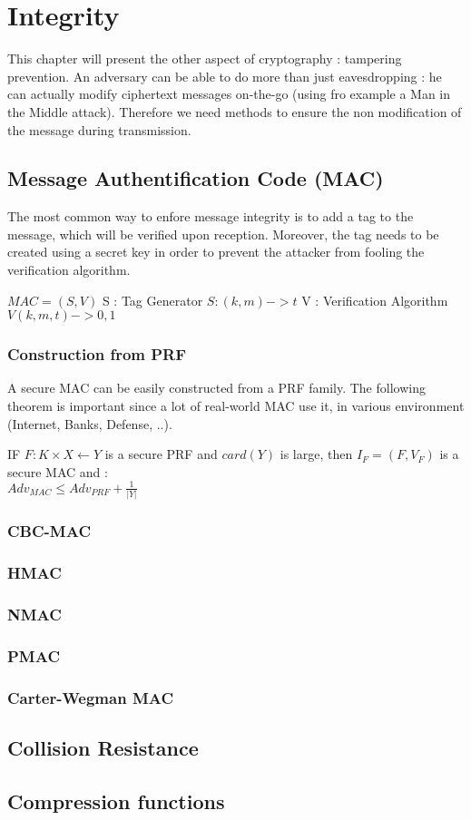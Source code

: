 \chapter{Integrity}


This chapter will present the other aspect of cryptography : tampering prevention. An adversary can be able to do more than just eavesdropping : he can actually modify ciphertext messages on-the-go (using fro example a Man in the Middle attack). Therefore we need methods to ensure the non modification of the message during transmission.

\section{Message Authentification Code (MAC)}

The most common way to enfore message integrity is to add a tag to the message, which will be verified upon reception. Moreover, the tag needs to be created using a secret key in order to prevent the attacker from fooling the verification algorithm.

$MAC = (S,V)$
S : Tag Generator
    $S: (k,m) -> t$
V : Verification Algorithm
    $V(k,m,t) -> {0,1}$
    
\subsection{Construction from PRF}

A secure MAC can be easily constructed from a PRF family. The following theorem is important since a lot of real-world MAC use it, in various environment (Internet, Banks, Defense, ..).

\begin{mytheorem}
    IF $F:K\times X \leftarrow Y$ is a secure PRF and $card(Y)$ is large, then $I_F = (F, V_F)$ is a secure MAC and : \\
    $ Adv_{MAC} \leq Adv_{PRF} + \frac{1}{|Y|} $
\end{mytheorem}


\subsection{CBC-MAC}
\subsection{HMAC}
\subsection{NMAC}
\subsection{PMAC}
\subsection{Carter-Wegman MAC}


\section{Collision Resistance}
\section{Compression functions}